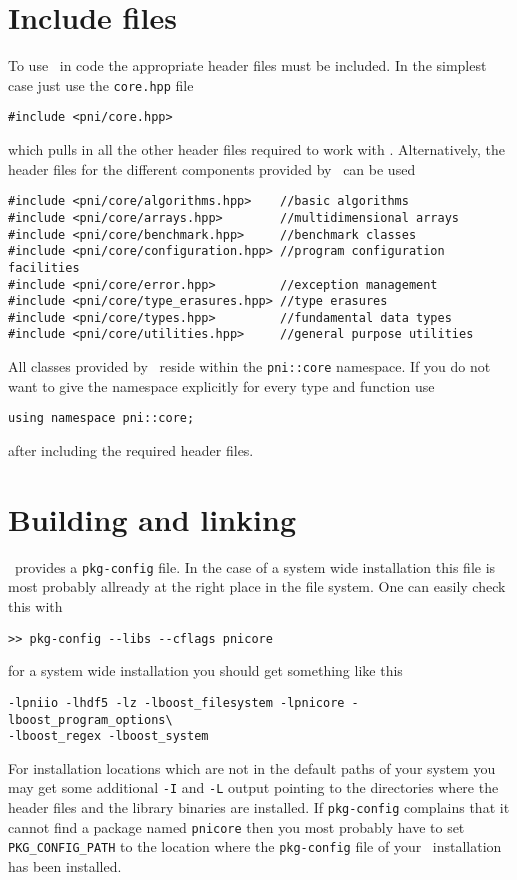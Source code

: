 \section{Include files}

To use \libpnicore\ in code the appropriate header files must be included. In
the simplest case just use the \texttt{core.hpp} file 
\begin{verbatim}
#include <pni/core.hpp>
\end{verbatim}
which pulls in all the other header files required to work with \libpnicore.
Alternatively, the header files for the different components provided by
\libpnicore\ can be used
\begin{verbatim}
#include <pni/core/algorithms.hpp>    //basic algorithms
#include <pni/core/arrays.hpp>        //multidimensional arrays
#include <pni/core/benchmark.hpp>     //benchmark classes
#include <pni/core/configuration.hpp> //program configuration facilities
#include <pni/core/error.hpp>         //exception management
#include <pni/core/type_erasures.hpp> //type erasures
#include <pni/core/types.hpp>         //fundamental data types
#include <pni/core/utilities.hpp>     //general purpose utilities
\end{verbatim}
All classes provided by \libpnicore\ reside within the \texttt{pni::core}
namespace. If you do not want to give the namespace explicitly for every type
and function use
\begin{verbatim}
using namespace pni::core;
\end{verbatim}
after including the required header files.

\section{Building and linking}
\libpnicore\ provides a \texttt{pkg-config} file. In the case of a system wide
installation this file is most probably allready at the right place in the file
system. One can easily check this with 
\begin{verbatim}
>> pkg-config --libs --cflags pnicore 
\end{verbatim}
for a system wide installation you should get something like this
\begin{verbatim}
-lpniio -lhdf5 -lz -lboost_filesystem -lpnicore -lboost_program_options\ 
-lboost_regex -lboost_system 
\end{verbatim}
For installation locations which are not in the default paths of your system you
may get some additional \texttt{-I} and \texttt{-L} output pointing to the directories
where the header files and the library binaries are installed.
If \texttt{pkg-config} complains that it cannot find a package named \texttt{pnicore}
then you most probably have to set \texttt{PKG\_CONFIG\_PATH} to the location where 
the \texttt{pkg-config} file of your \libpnicore\ installation has been installed. 

